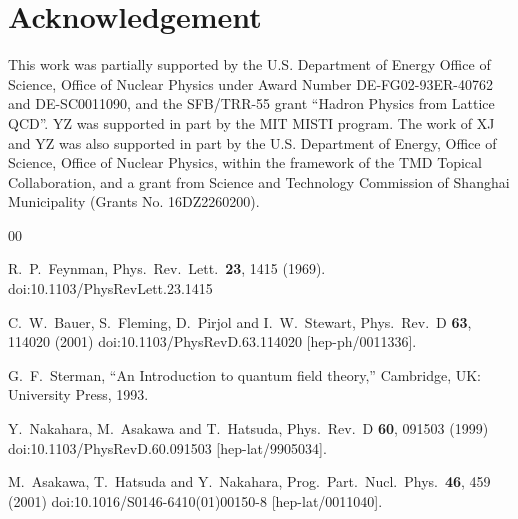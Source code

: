 \section*{Acknowledgement}
This work was partially supported by the U.S. Department of Energy Office of Science, Office of Nuclear Physics under Award Number DE-FG02-93ER-40762 and DE-SC0011090,
and the SFB/TRR-55 grant ``Hadron Physics from Lattice QCD''. YZ was supported in part by the MIT MISTI program. The work of XJ and YZ was also supported in part by the
U.S. Department of Energy, Office of Science, Office of Nuclear Physics, within the framework of the TMD Topical Collaboration,
and a grant from Science and Technology Commission of Shanghai Municipality (Grants No. 16DZ2260200).

\begin{thebibliography}{00}

	R.~P.~Feynman,
	Phys.\ Rev.\ Lett.\  {\bf 23}, 1415 (1969).
	doi:10.1103/PhysRevLett.23.1415


	C.~W.~Bauer, S.~Fleming, D.~Pirjol and I.~W.~Stewart,
	Phys.\ Rev.\ D {\bf 63}, 114020 (2001)
	doi:10.1103/PhysRevD.63.114020
	[hep-ph/0011336].


	G.~F.~Sterman,
	``An Introduction to quantum field theory,''
	Cambridge, UK: University Press, 1993.


	Y.~Nakahara, M.~Asakawa and T.~Hatsuda,
	Phys.\ Rev.\ D {\bf 60}, 091503 (1999)
	doi:10.1103/PhysRevD.60.091503
	[hep-lat/9905034].


	M.~Asakawa, T.~Hatsuda and Y.~Nakahara,
	Prog.\ Part.\ Nucl.\ Phys.\  {\bf 46}, 459 (2001)
	doi:10.1016/S0146-6410(01)00150-8
	[hep-lat/0011040].



\end{thebibliography}
